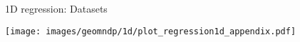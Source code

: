 \begin{frame}{1D regression: Datasets}
    \begin{center}
        \texttt{[image: images/geomndp/1d/plot\_regression1d\_appendix.pdf]}
    \end{center}
    
\end{frame}

    
